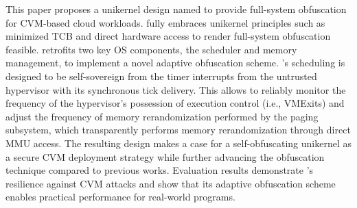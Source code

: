 This paper proposes a unikernel design named \thename to provide full-system obfuscation for CVM-based cloud workloads.
\thename fully embraces unikernel principles such as minimized TCB and direct hardware access to render full-system obfuscation feasible.
\thename retrofits two key OS components, the scheduler and memory management, to implement a novel adaptive obfuscation scheme.
\thename's scheduling is designed to be self-sovereign from the timer interrupts from the untrusted hypervisor with its synchronous tick delivery.
This allows \thename to reliably monitor the frequency of the hypervisor's possession of execution control (i.e., VMExits) and adjust the frequency of memory rerandomization performed by the paging subsystem, which transparently performs memory rerandomization through direct MMU access.
The resulting \thename design makes a case for a self-obfuscating unikernel as a secure CVM deployment strategy while further advancing the obfuscation technique compared to previous works.
Evaluation results demonstrate \thename's resilience against CVM attacks and show that its adaptive obfuscation scheme enables practical performance for real-world programs.



